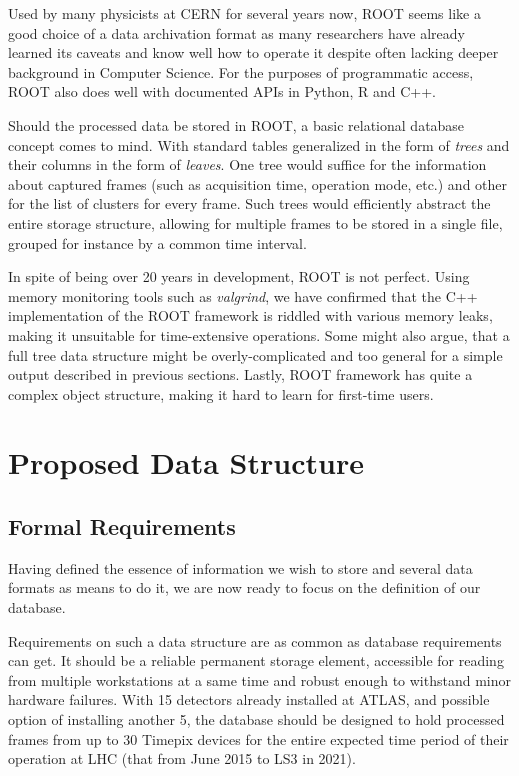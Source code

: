 
Used by many physicists at CERN for several years now, ROOT seems like a good choice of a data archivation format as many researchers have already learned its caveats and know well how to operate it despite often lacking deeper background in Computer Science. For the purposes of programmatic access, ROOT also does well with documented APIs in Python, R and C++.

Should the processed data be stored in ROOT, a basic relational database concept comes to mind. With standard tables generalized in the form of \textit{trees} and their columns in the form of \textit{leaves}. One tree would suffice for the information about captured frames (such as acquisition time, operation mode, etc.) and other for the list of clusters for every frame. Such trees would efficiently abstract the entire storage structure, allowing for multiple frames to be stored in a single file, grouped for instance by a common time interval.

In spite of being over 20 years in development, ROOT is not perfect. Using memory monitoring tools such as \textit{valgrind}, we have confirmed that the C++ implementation of the ROOT framework is riddled with various memory leaks, making it unsuitable for time-extensive operations. Some might also argue, that a full tree data structure might be overly-complicated and too general for a simple output described in previous sections. Lastly, ROOT framework has quite a complex object structure, making it hard to learn for first-time users.


\section{Proposed Data Structure}

\subsection{Formal Requirements}
Having defined the essence of information we wish to store and several data formats as means to do it, we are now ready to focus on the definition of our database.

Requirements on such a data structure are as common as database requirements can get. It should be a reliable permanent storage element, accessible for reading from multiple workstations at a same time and robust enough to withstand minor hardware failures. With 15 detectors already installed at ATLAS, and possible option of installing another 5, the database should be designed to hold processed frames from up to 30 Timepix devices for the entire expected time period of their operation at LHC (that from June 2015 to LS3 in 2021).

